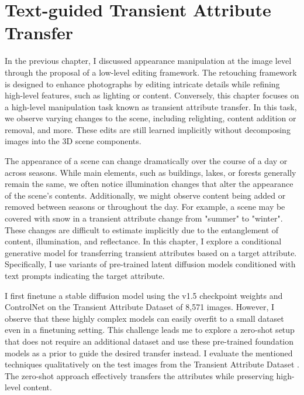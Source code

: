 \chapter{Text-guided Transient Attribute Transfer}\label{zero-shot}

In the previous chapter, I discussed appearance manipulation at the image level through the proposal of a low-level editing framework. The retouching framework is designed to enhance photographs by editing intricate details while refining high-level features, such as lighting or content. Conversely, this chapter focuses on a high-level manipulation task known as transient attribute transfer. In this task, we observe varying changes to the scene, including relighting, content addition or removal, and more. These edits are still learned implicitly without decomposing images into the 3D scene components.

The appearance of a scene can change dramatically over the course of a day or across seasons. While main elements, such as buildings, lakes, or forests generally remain the same, we often notice illumination changes that alter the appearance of the scene’s contents. Additionally, we might observe content being added or removed between seasons or throughout the day. For example, a scene may be covered with snow in a transient attribute change from "summer" to "winter". These changes are difficult to estimate implicitly due to the entanglement of content, illumination, and reflectance. In this chapter, I explore a conditional generative model for transferring transient attributes based on a target attribute. Specifically, I use variants of pre-trained latent diffusion models conditioned with text prompts indicating the target attribute.

I first finetune a stable diffusion model using the v1.5 checkpoint weights \cite{rombach2022high} and ControlNet \cite{zhang2023adding} on the Transient Attribute Dataset \cite{laffont2014transient} of 8,571 images. However, I observe that these highly complex models can easily overfit to a small dataset even in a finetuning setting. This challenge leads me to explore a zero-shot setup that does not require an additional dataset and use these pre-trained foundation models as a prior to guide the desired transfer instead. I evaluate the mentioned techniques qualitatively on the test images from the Transient Attribute Dataset \cite{laffont2014transient} . The zero-shot approach effectively transfers the attributes while preserving high-level content.


